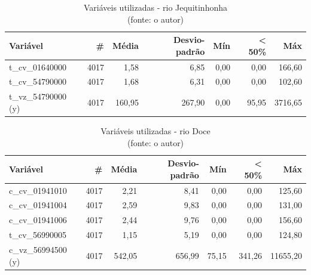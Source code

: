 \begin{table}[!h]
	\centering \small
	\caption{Variáveis utilizadas - rio Jequitinhonha \\(fonte: o autor)}
	\begin{tabular}{|l|r|r|r|r|r|r|} \hline 
		\textbf{Variável}   & \textbf{\#} & \textbf{Média} & \textbf{Desvio-padrão} & \textbf{Mín} & \textbf{< 50\%} & \textbf{Máx} \\\hline
		t\_cv\_01640000     & 4017        & 1,58           & 6,85                   & 0,00         & 0,00            & 166,60       \\\hline
		t\_cv\_54790000     & 4017        & 1,68           & 6,31                   & 0,00         & 0,00            & 102,60       \\\hline
		t\_vz\_54790000 (y) & 4017        & 160,95         & 267,90                 & 0,00         & 95,95           & 3716,65      \\\hline
	\end{tabular}
	\label{tab:variaveis_jequitinhonha}
\end{table}

\begin{table}[!h]
	\centering \small
	\caption{Variáveis utilizadas - rio Doce \\(fonte: o autor)}
	\begin{tabular}{|l|r|r|r|r|r|r|} \hline 
		\textbf{Variável}   & \textbf{\#} & \textbf{Média} & \textbf{Desvio-padrão} & \textbf{Mín} & \textbf{< 50\%} & \textbf{Máx} \\\hline
		c\_cv\_01941010     & 4017        & 2,21           & 8,41                   & 0,00         & 0,00            & 125,60       \\\hline
		c\_cv\_01941004     & 4017        & 2,59           & 9,83                   & 0,00         & 0,00            & 131,00       \\\hline
		c\_cv\_01941006     & 4017        & 2,44           & 9,76                   & 0,00         & 0,00            & 156,60       \\\hline
		t\_cv\_56990005     & 4017        & 1,15           & 5,19                   & 0,00         & 0,00            & 124,80       \\\hline
		c\_vz\_56994500 (y) & 4017        & 542,05         & 656,99                 & 75,15        & 341,26          & 11655,20     \\\hline
	\end{tabular}
	\label{tab:variaveis_rio_doce}
\end{table}

